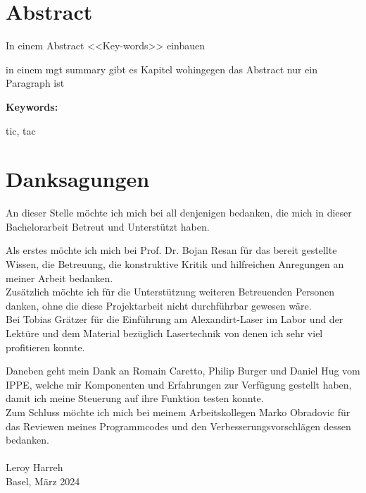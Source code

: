 \section*{Abstract}
In einem Abstract <<Key-words>> einbauen

in einem mgt summary gibt es Kapitel wohingegen das Abstract nur ein Paragraph ist

\vspace{2ex}

\textbf{Keywords:}

tic, tac

\clearpage

\section*{Danksagungen}
An dieser Stelle möchte ich mich bei all denjenigen bedanken, die mich in dieser Bachelorarbeit Betreut und Unterstützt haben.

Als erstes möchte ich mich bei Prof. Dr. Bojan Resan für das bereit gestellte Wissen, die Betreuung, die konstruktive Kritik und hilfreichen Anregungen an meiner Arbeit bedanken.\\

Zusätzlich möchte ich für die Unterstützung weiteren Betreuenden Personen danken, ohne die diese Projektarbeit nicht durchführbar gewesen wäre.\\ Bei Tobias Grätzer für die Einführung am Alexandirt-Laser im Labor und der Lektüre und dem Material bezüglich Lasertechnik von denen ich sehr viel profitieren konnte.

Daneben geht mein Dank an Romain Caretto, Philip Burger und Daniel Hug vom IPPE, welche mir Komponenten und Erfahrungen zur Verfügung gestellt haben, damit ich meine Steuerung auf ihre Funktion testen konnte.\\

Zum Schluss möchte ich mich bei meinem Arbeitskollegen Marko Obradovic für das Reviewen meines Programmcodes und den Verbesserungsvorschlägen dessen bedanken.
\\\\
Leroy Harreh\\
Basel, März 2024

